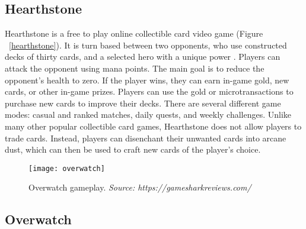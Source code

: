 \subsection{Hearthstone}

Hearthstone is a free to play online collectible card video game (Figure ~\ref{hearthstone}). It is turn based between two opponents, who use constructed decks of thirty cards, and a selected hero with a unique power  \cite{Hearthstone}. Players can attack the opponent using mana points. The main goal is to reduce the opponent's health to zero. If the player wins, they can earn in-game gold, new cards, or other in-game prizes. Players can use the gold or microtransactions to purchase new cards to improve their decks. There are several different game modes: casual and ranked matches, daily quests, and weekly challenges. Unlike many other popular collectible card games, Hearthstone does not allow players to trade cards. Instead, players can disenchant their unwanted cards into arcane dust, which can then be used to craft new cards of the player's choice. 

\begin{figure}[h]
\centering
\texttt{[image: overwatch]}
\caption{Overwatch gameplay. \textit{Source: https://gamesharkreviews.com/}}
\label{overwatch}
\end{figure}

\subsection{Overwatch}

